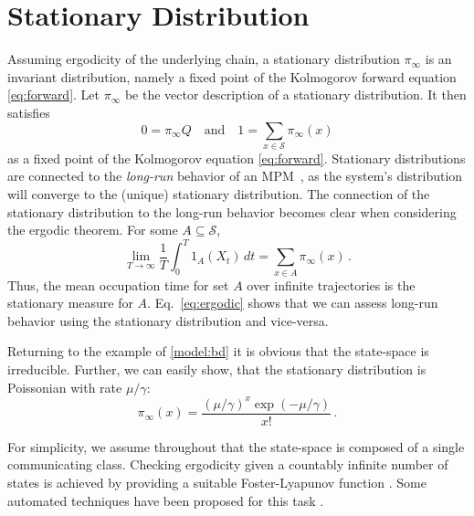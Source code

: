 \section{Stationary Distribution}\label{sec:stationary_dist}
Assuming
ergodicity  
of the underlying chain, a stationary distribution $\pi_{\infty}$ is an invariant distribution, namely a fixed point of the Kolmogorov forward equation \eqref{eq:forward}.
Let $\pi_{\infty}$ be the vector description of a stationary distribution. It then  satisfies
\begin{equation}\label{eq:stationary}
0=\pi_{\infty}Q\quad\text{and}\quad 1=\sum_{x\in\mathcal{S}}\pi_{\infty}(x)
\end{equation}
as a fixed point of the Kolmogorov equation \eqref{eq:forward}.
Stationary distributions are connected to the \emph{long-run} behavior of an \ac{MPM}~\cite{dayar2011bounding}, as the system's distribution will converge to the (unique)
stationary distribution.
The connection of the stationary distribution to the long-run behavior becomes clear when considering the ergodic theorem. 
For some $A\subseteq\mathcal{S}$,
\begin{equation}\label{eq:ergodic}
    \lim_{T\to\infty}\frac{1}{T}\int_0^T 1_A(X_t)\,dt
    = \sum_{x\in A}\pi_{\infty}(x)\,.
\end{equation}
Thus, the mean occupation time for set $A$ over infinite trajectories is the stationary measure for $A$.
Eq.~\eqref{eq:ergodic} shows that we can assess long-run behavior using the stationary distribution and vice-versa.

\begin{example}
	Returning to the example of \autoref{model:bd} it is obvious that the state-space is irreducible.
Further, we can easily show, that the stationary distribution is Poissonian with rate $\mu/\gamma$:
$$ \pi_{\infty}(x)=\frac{{(\mu/\gamma)}^{x}\exp(-\mu/\gamma)}{x!}\,.$$
\end{example}


For simplicity, we assume throughout that the state-space is composed of a single communicating class.
Checking ergodicity given a countably infinite number of states is achieved by providing a suitable Foster-Lyapunov function \cite{meyn2012markov}.
Some automated techniques have been proposed for this task \cite{dayar2011bounding,gupta2014scalable,milias2014optimization}.



